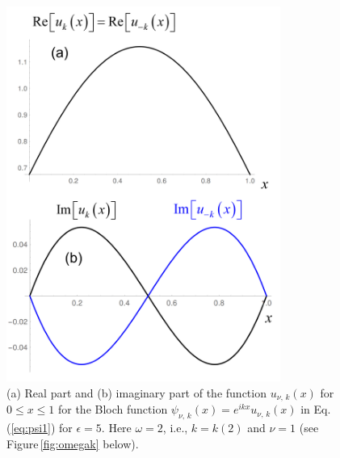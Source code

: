 \begin{figure}
    \includegraphics[width=0.8\textwidth, keepaspectratio]{figures/system/u.png}
    \caption{(a) Real part and (b) imaginary part of the function $u_{\nu,\,k}(x)$ 
    for $0 \le x \le 1$ for the Bloch function 
    $\psi_{\nu,\,k}(x) = e^{i k x} u_{\nu,\,k}(x)$ in Eq.\,(\ref{eq:psi1}) for $\epsilon=5$. 
    Here $\omega=2$, i.e., $k = k(2)$ and $\nu=1$ (see Figure\,\ref{fig:omegak} below).}
    \label{fig:u}
\end{figure}

